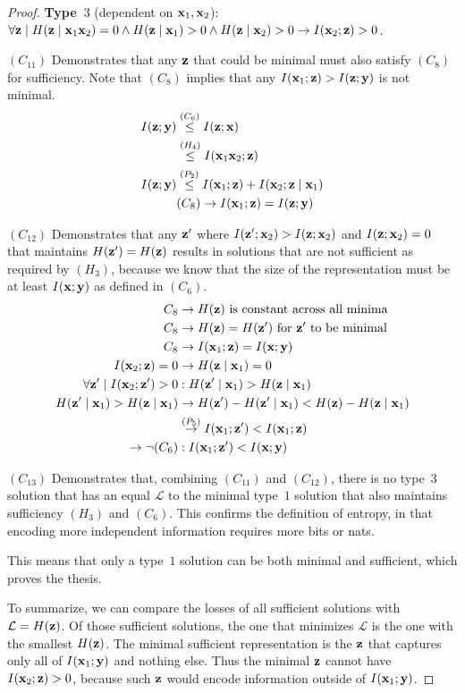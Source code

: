 \begin{proof}
\textbf{Type~$3$} (dependent on ${\mathbf{x}}_1, {\mathbf{x}}_2$): $\forall {\mathbf{z}} \mid H({\mathbf{z}} \mid {\mathbf{x}}_1 {\mathbf{x}}_2)=0 \land H({\mathbf{z}} \mid {\mathbf{x}}_1)>0 \land H({\mathbf{z}} \mid {\mathbf{x}}_2)>0 \rightarrow I({\mathbf{x}}_2; {\mathbf{z}}) > 0$.

$(C_{11})$ Demonstrates that any ${\mathbf{z}}$ that could be minimal must also satisfy $(C_8)$ for sufficiency. Note that $(C_8)$ implies that any $I({\mathbf{x}}_1; {\mathbf{z}}) > I({\mathbf{z}};{\mathbf{y}})$ is not minimal.
\begin{align*} I({\mathbf{z}}; {\mathbf{y}}) &\stackrel{\left(C_6\right)}{\leq} I({\mathbf{z}}; {\mathbf{x}}) \\ &\stackrel{\left(H_4\right)}{\leq} I({\mathbf{x}}_1 {\mathbf{x}}_2; {\mathbf{z}}) \\ I({\mathbf{z}}; {\mathbf{y}}) &\stackrel{\left(P_2\right)}{\leq} I({\mathbf{x}}_1; {\mathbf{z}}) + I({\mathbf{x}}_2; {\mathbf{z}} \mid {\mathbf{x}}_1) \\ &(C_8) \rightarrow I({\mathbf{x}}_1; {\mathbf{z}}) = I({\mathbf{z}}; {\mathbf{y}}) \end{align*}

$(C_{12})$ Demonstrates that any ${\mathbf{z}}'$ where $I({\mathbf{z}}'; {\mathbf{x}}_2)>I({\mathbf{z}}; {\mathbf{x}}_2)$ and $I({\mathbf{z}}; {\mathbf{x}}_2) = 0$ that maintains $H({\mathbf{z}}') = H({\mathbf{z}})$ results in solutions that are not sufficient as required by $(H_3)$, because we know that the size of the representation must be at least $I({\mathbf{x}}; {\mathbf{y}})$ as defined in $(C_6)$.
\begin{align*} C_8 &\rightarrow H({\mathbf{z}}) \text{ is constant across all minima} \\ C_8 &\rightarrow H({\mathbf{z}}) = H({\mathbf{z}}') \text{ for } {\mathbf{z}}' \text{ to be minimal} \\ C_8 &\rightarrow I({\mathbf{x}}_1; {\mathbf{z}}) = I({\mathbf{x}}; {\mathbf{y}}) \\ I({\mathbf{x}}_2; {\mathbf{z}}) = 0 &\rightarrow H({\mathbf{z}} \mid {\mathbf{x}}_1) = 0 \\ \forall {\mathbf{z}}' \mid I({\mathbf{x}}_2; {\mathbf{z}}') > 0 &: H({\mathbf{z}}' \mid {\mathbf{x}}_1) > H({\mathbf{z}} \mid {\mathbf{x}}_1) \\ H({\mathbf{z}}' \mid {\mathbf{x}}_1) > H({\mathbf{z}} \mid {\mathbf{x}}_1) &\rightarrow H({\mathbf{z}}') - H({\mathbf{z}}' \mid {\mathbf{x}}_1) < H({\mathbf{z}}) - H({\mathbf{z}} \mid {\mathbf{x}}_1) \\ &\stackrel{\left(P_5\right)}{\rightarrow} I({\mathbf{x}}_1; {\mathbf{z}}') < I({\mathbf{x}}_1; {\mathbf{z}}) \\ \rightarrow \neg (C_6)&: I({\mathbf{x}}_1; {\mathbf{z}}') < I({\mathbf{x}}; {\mathbf{y}}) \end{align*}

$(C_{13})$ Demonstrates that, combining $(C_{11})$ and $(C_{12})$, there is no type~$3$ solution that has an equal $\mathcal{L}$ to the minimal type~$1$ solution that also maintains sufficiency $(H_3)$ and $(C_6)$. This confirms the definition of entropy, in that encoding more independent information requires more bits or nats.

This means that only a type~$1$ solution can be both minimal and sufficient, which proves the thesis.

To summarize, we can compare the losses of all sufficient solutions with $\mathcal{L} = H({\mathbf{z}})$. Of those sufficient solutions, the one that minimizes $\mathcal{L}$ is the one with the smallest $H({\mathbf{z}})$. The minimal sufficient representation is the ${\mathbf{z}}$ that captures only all of $I({\mathbf{x}}_1; {\mathbf{y}})$ and nothing else. Thus the minimal ${\mathbf{z}}$ cannot have $I({\mathbf{x}}_2; {\mathbf{z}}) > 0$, because such ${\mathbf{z}}$ would encode information outside of $I({\mathbf{x}}_1; {\mathbf{y}})$.
\end{proof}

